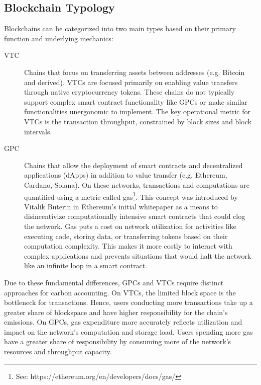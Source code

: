 \documentclass[11pt]{report}
\begin{document}
\subsection{Blockchain Typology \label{sec:blockchain_typology}}
Blockchains can be categorized into two main types based on their primary function and underlying mechanics:

\begin{description}
    \item[\ac{VTC}] Chains that focus on transferring assets between addresses (e.g. Bitcoin and derived). VTCs are focused primarily on enabling value transfers through native cryptocurrency tokens. These chains do not typically support complex smart contract functionality like GPCs or make similar functionalities unergonomic to implement. The key operational metric for VTCs is the transaction throughput, constrained by block sizes and block intervals.

    \item[\ac{GPC}] Chains that allow the deployment of smart contracts and decentralized applications (dApps) in addition to value transfer (e.g. Ethereum, Cardano, Solana). On these networks, transactions and computations are quantified using a metric called gas\footnote{See: https://ethereum.org/en/developers/docs/gas/}. This concept was introduced by Vitalik Buterin in Ethereum's initial whitepaper \cite{buterinEthereumNextgenerationSmart} as a means to disincentivize computationally intensive smart contracts that could clog the network. Gas puts a cost on network utilization for activities like executing code, storing data, or transferring tokens based on their computation complexity. This makes it more costly to interact with complex applications and prevents situations that would halt the network like an infinite loop in a smart contract.
\end{description}

Due to these fundamental differences, GPCs and VTCs require distinct approaches for carbon accounting. On VTCs, the limited block space is the bottleneck for transactions. Hence, users conducting more transactions take up a greater share of blockspace and have higher responsibility for the chain's emissions. On GPCs, gas expenditure more accurately reflects utilization and impact on the network's computation and storage load. Users spending more gas have a greater share of responsibility by consuming more of the network's resources and throughput capacity.
\end{document}
